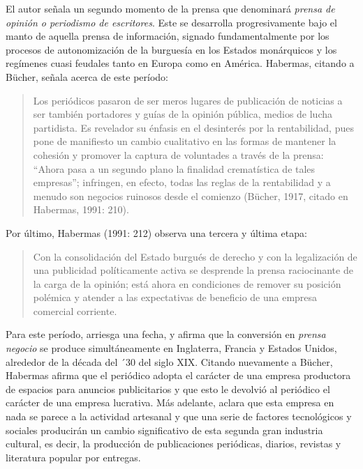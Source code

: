 El autor señala un segundo momento de la prensa que denominará \emph{prensa de opinión o periodismo de escritores}. Este se desarrolla progresivamente bajo el manto de aquella prensa de información, signado fundamentalmente por los procesos de autonomización de la burguesía en los Estados monárquicos y los regímenes cuasi feudales tanto en Europa como en América. Habermas, citando a Bücher, señala acerca de este período:

\begin{quote}
	Los periódicos pasaron de ser meros lugares de publicación de noticias a ser también portadores y guías de la opinión pública, medios de lucha partidista. Es revelador su énfasis en el desinterés por la rentabilidad, pues pone de manifiesto un cambio cualitativo en las formas de mantener la cohesión y promover la captura de voluntades a través de la prensa: \enquote{Ahora pasa a un segundo plano la finalidad crematística de tales empresas}; infringen, en efecto, todas las reglas de la rentabilidad y a menudo son negocios ruinosos desde el comienzo (Bücher, 1917, citado en Habermas, 1991: 210).
\end{quote}


Por último, Habermas (1991: 212) observa una tercera y última etapa:

\begin{quote}
	Con la consolidación del Estado burgués de derecho y con la legalización de una publicidad políticamente activa se desprende la prensa raciocinante de la carga de la opinión; está ahora en condiciones de remover su posición polémica y atender a las expectativas de beneficio de una empresa comercial corriente.
\end{quote}


Para este período, arriesga una fecha, y afirma que la conversión en \emph{prensa negocio} se produce simultáneamente en Inglaterra, Francia y Estados Unidos, alrededor de la década del ´30 del siglo XIX. Citando nuevamente a Bücher, Habermas afirma que el periódico adopta el carácter de una empresa productora de espacios para anuncios publicitarios y que esto le devolvió al periódico el carácter de una empresa lucrativa. Más adelante, aclara que esta empresa en nada se parece a la actividad artesanal y que una serie de factores tecnológicos y sociales producirán un cambio significativo de esta segunda gran industria cultural, es decir, la producción de publicaciones periódicas, diarios, revistas y literatura popular por entregas.

